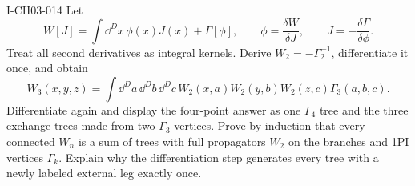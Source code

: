 \begin{exercise}{I-CH03-014}
Let
\[
 W[J]=\int\dd^D x\,\phi(x)J(x)+\Gamma[\phi],
 \qquad \phi=\frac{\delta W}{\delta J},
 \qquad J=-\frac{\delta\Gamma}{\delta\phi}.
\]
Treat all second derivatives as integral kernels.  Derive
\(W_2=-\Gamma_2^{-1}\), differentiate it once, and obtain
\[
 W_3(x,y,z)=\int\dd^D a\,\dd^D b\,\dd^D c\,
 W_2(x,a)W_2(y,b)W_2(z,c)\Gamma_3(a,b,c).
\]
Differentiate again and display the
four-point answer as one $\Gamma_4$ tree and the three exchange trees made
from two $\Gamma_3$ vertices.  Prove by induction that every connected
$W_n$ is a sum of trees with full propagators $W_2$ on the branches and 1PI
vertices $\Gamma_k$.  Explain why the differentiation step generates every
tree with a newly labeled external leg exactly once.
\end{exercise}

